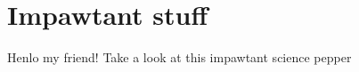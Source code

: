 \documentclass[hidelinks,a4paper,12pt]{article}
\begin{document}
\tableofcontents

\pagebreak

\section{Impawtant stuff}

Henlo my friend! Take a look at this impawtant science pepper \cite{SimpleRef}

\pagebreak

\printbibliography
\end{document}
